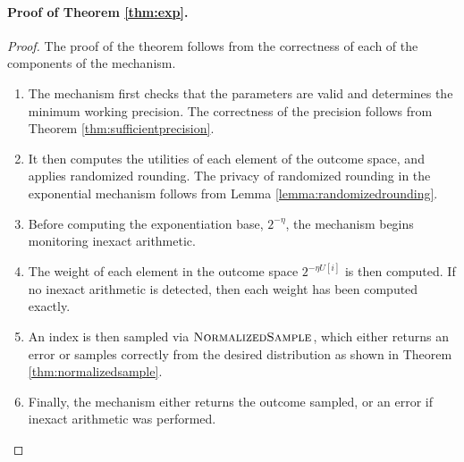 \documentclass[11pt]{article}
\theoremstyle{definition}
\begin{document}
\paragraph{Proof of Theorem \ref{thm:exp}.}
\begin{proof}
The proof of the theorem follows from the correctness of each of the components of the mechanism.
\begin{enumerate}
    \item The mechanism first checks that the parameters are valid and determines the minimum working precision. The correctness of the precision follows from Theorem \ref{thm:sufficientprecision}.
    \item It then computes the utilities of each element of the outcome space, and applies randomized rounding. The privacy of randomized rounding in the exponential mechanism follows from Lemma \ref{lemma:randomizedrounding}. 
    \item Before computing the exponentiation base, $2^{-\eta}$, the mechanism begins monitoring inexact arithmetic. 
    \item The weight of each element in the outcome space $2^{-\eta U[i]}$ is then computed. If no inexact arithmetic is detected, then each weight has been computed exactly.
    \item An index is then sampled via $\textsc{NormalizedSample}$, which either returns an error or samples correctly from the desired distribution as shown in Theorem \ref{thm:normalizedsample}.
    \item Finally, the mechanism either returns the outcome sampled, or an error if inexact arithmetic was performed.
\end{enumerate}
\end{proof}
\end{document}
